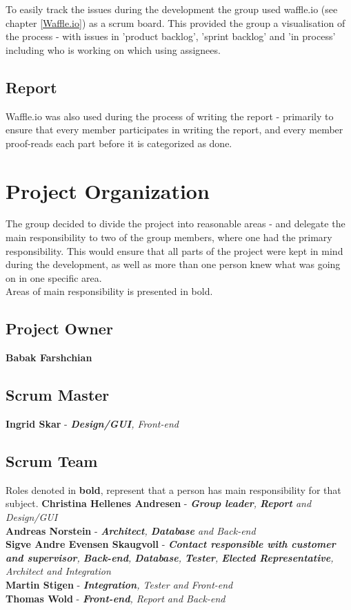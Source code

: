 \noindent To easily track the issues during the development the group used waffle.io (see chapter  \ref{Waffle.io}) as a scrum board. This provided the group a visualisation of the process - with issues in 'product backlog', 'sprint backlog' and 'in process' including who is working on which using assignees. 

\subsection{Report}
Waffle.io was also used during the process of writing the report - primarily to ensure that every member participates in writing the report, and every member proof-reads each part before it is categorized as done.  


\section{Project Organization}\label{projectOrganisation}
The group decided to divide the project into reasonable areas - and delegate the main responsibility to two of the group members, where one had the primary responsibility. This would ensure that all parts of the project were kept in mind during the development, as well as more than one person knew what was going on in one specific area.\\
Areas of main responsibility is presented in bold.

\subsection{Project Owner}
\textbf{Babak Farshchian}

\subsection{Scrum Master}
\textbf{Ingrid Skar} - \emph{\textbf{Design/GUI}, Front-end}

\subsection{Scrum Team}
Roles denoted in \textbf{bold}, represent that a person has main responsibility for that subject.
\textbf{Christina Hellenes Andresen} - \emph{\textbf{Group leader}, \textbf{Report} and Design/GUI}\\
\noindent \textbf{Andreas Norstein} - \emph{\textbf{Architect}, \textbf{Database} and Back-end}\\
\noindent \textbf{Sigve Andre Evensen Skaugvoll} - \emph{\textbf{Contact responsible with customer and supervisor}, \textbf{Back-end}, \textbf{Database}, \textbf{Tester}, \textbf{Elected Representative}, Architect and Integration}\\
\noindent \textbf{Martin Stigen} - \emph{\textbf{Integration}, Tester and Front-end} \\
\noindent \textbf{Thomas Wold} - \emph{\textbf{Front-end}, Report and Back-end}\\ 

